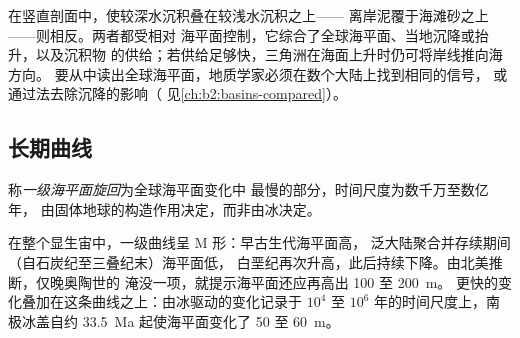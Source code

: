 在竖直剖面中，使较深水沉积叠在较浅水沉积之上——
离岸泥覆于海滩砂之上——则相反。两者都受相对
海平面控制，它综合了全球海平面、当地沉降或抬升，以及沉积物
的供给；若供给足够快，三角洲在海面上升时仍可将岸线推向海方向。
要从中读出全球海平面，地质学家必须在数个大陆上找到相同的信号，
或通过法去除沉降的影响（
见\cref{ch:b2:basins-compared}）。

\subsection*{长期曲线}

\begin{definition}[一级海平面旋回]\label{def:b2:phanerozoic-earth:first-order}
称\emph{一级海平面旋回}为全球海平面变化中
最慢的部分，时间尺度为数千万至数亿年，
由固体地球的构造作用决定，而非由冰决定。
\end{definition}

在整个显生宙中，一级曲线呈 M 形：早古生代海平面高，
泛大陆聚合并存续期间（自石炭纪至三叠纪末）海平面低，
白垩纪再次升高，此后持续下降。由北美推断，仅晚奥陶世的
淹没一项，就提示海平面还应再高出 100 至 \qty{200}{m}。
更快的变化叠加在这条曲线之上：由冰驱动的变化记录于 $10^4$ 至
$10^6$ 年的时间尺度上，南极冰盖自约 \qty{33.5}{Ma} 起使海平面变化了 50 至
\qty{60}{m}。

